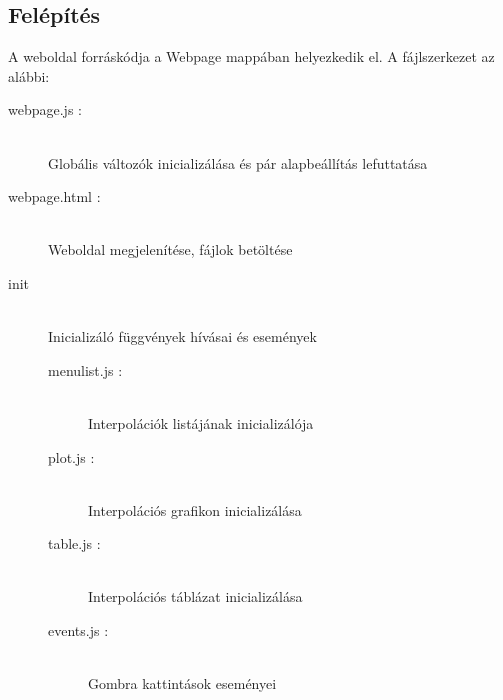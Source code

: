 \subsection{Felépítés}
	A weboldal forráskódja a Webpage mappában helyezkedik el. 
	A fájlszerkezet az alábbi:
	\begin{description}
		\item[webpage.js :] \hfill \\  Globális változók inicializálása és pár alapbeállítás lefuttatása
		\item[webpage.html :]  \hfill \\ Weboldal megjelenítése, fájlok betöltése
		\item[init] 
		\hfill \\ Inicializáló függvények hívásai és események
		\begin{description}
			\item[menulist.js : ]
			\hfill \\ Interpolációk listájának inicializálója
		  	\item[plot.js : ]
		  	\hfill \\ Interpolációs grafikon inicializálása
			\item[table.js : ]
			\hfill \\ Interpolációs táblázat inicializálása
		 	\item[events.js : ]
		 	\hfill \\ Gombra kattintások eseményei
		\end{description}


\end{description}
